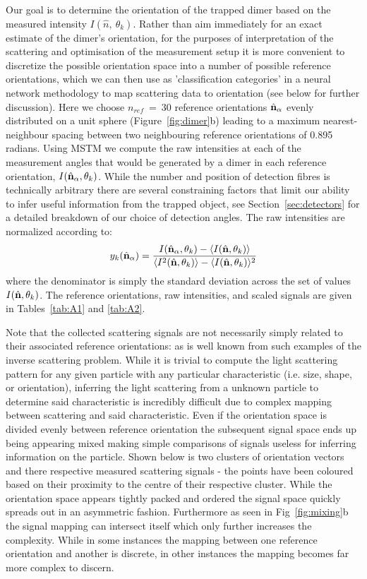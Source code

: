 \documentclass[12pt]{spieman}
\begin{document}
\begin{spacing}{1.5}
Our goal is to determine the orientation of the trapped dimer based on the measured intensity $I(\hat{n}, \ \theta_k)$. Rather than aim immediately for an exact estimate of the dimer's orientation, for the purposes of interpretation of the scattering and optimisation of the measurement setup it is more convenient to discretize the possible orientation space into a number of possible reference orientations, which we can then use as 'classification categories' in a neural network methodology to map scattering data to orientation (see below for further discussion).  Here we choose $\textit{n}_{ref} \ = \ 30$ reference orientations $\hat{\bf n}_{\alpha}$  evenly distributed on a unit sphere \cite{Rey2006} (Figure~\ref{fig:dimer}b) leading to a maximum nearest-neighbour spacing between two neighbouring reference orientations of 0.895 radians. Using MSTM we compute the raw intensities at each of the measurement angles that would be generated by a dimer in each reference orientation, $I(\hat{\bf n}_{\alpha}, \theta_k)$. While the number and position of detection fibres is technically arbitrary there are several constraining factors that limit our ability to infer useful information from the trapped object, see Section~\ref{sec:detectors} for a detailed breakdown of our choice of detection angles. The raw intensities are normalized according to:
\begin{align}
\label{eq:scale}
  y_k(\hat{\bf n}_\alpha)
  = 
  \frac{I(\hat{\bf n}_\alpha, \theta_k) - \langle I(\hat{\bf n},\theta_k) \rangle } 
  {\langle I^2(\hat{\bf n},\theta_k) \rangle -\langle I(\hat{\bf n}, \theta_k)\rangle^2}
\end{align}
where the denominator is simply the standard deviation across the set of values $I(\hat{\bf n}, \theta_k)$. The reference orientations, raw intensities, and scaled signals are given in Tables~\ref{tab:A1} and \ref{tab:A2}. 

Note that the collected scattering signals are not necessarily simply related to their associated reference orientations: as is well known from such examples of the inverse scattering problem. While it is trivial to compute the light scattering pattern for any given particle with any particular characteristic (i.e. size, shape, or orientation), inferring the light scattering from a unknown particle to determine said characteristic is incredibly difficult due to complex mapping between scattering and said characteristic. Even if the orientation space is divided evenly between reference orientation the subsequent signal space ends up being appearing mixed making simple comparisons of signals useless for inferring information on the particle. Shown below is two clusters of orientation vectors and there respective measured scattering signals - the points have been coloured based on their proximity to the centre of their respective cluster. While the orientation space appears tightly packed and ordered the signal space quickly spreads out in an asymmetric fashion. Furthermore as seen in Fig~\ref{fig:mixing}b the signal mapping can intersect itself which only further increases the complexity. While in some instances the mapping between one reference orientation and another is discrete, in other instances the mapping becomes far more complex to discern. 


\end{spacing}
\end{document}
